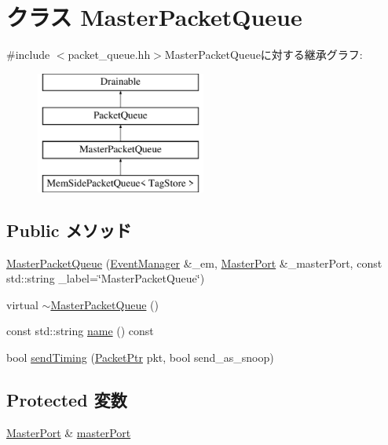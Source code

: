 \hypertarget{classMasterPacketQueue}{
\section{クラス MasterPacketQueue}
\label{classMasterPacketQueue}
}


{\ttfamily \#include $<$packet\_\-queue.hh$>$}MasterPacketQueueに対する継承グラフ:\begin{figure}[H]
\begin{center}
\leavevmode
\includegraphics[height=4cm]{classMasterPacketQueue}
\end{center}
\end{figure}
\subsection*{Public メソッド}
\begin{DoxyCompactItemize}
\item 
\hyperlink{classMasterPacketQueue_a95398bd9589a013635d2d0900aeb04a7}{MasterPacketQueue} (\hyperlink{classEventManager}{EventManager} \&\_\-em, \hyperlink{classMasterPort}{MasterPort} \&\_\-masterPort, const std::string \_\-label=\char`\"{}MasterPacketQueue\char`\"{})
\item 
virtual \hyperlink{classMasterPacketQueue_a24fcd3b9d1504075d27a0cef1ee13ade}{$\sim$MasterPacketQueue} ()
\item 
const std::string \hyperlink{classMasterPacketQueue_a6490f765a824ced1cc94979609fe7e07}{name} () const 
\item 
bool \hyperlink{classMasterPacketQueue_a49e787c20f2f8d3e4fc0b8213bebcfc4}{sendTiming} (\hyperlink{classPacket}{PacketPtr} pkt, bool send\_\-as\_\-snoop)
\end{DoxyCompactItemize}
\subsection*{Protected 変数}
\begin{DoxyCompactItemize}
\item 
\hyperlink{classMasterPort}{MasterPort} \& \hyperlink{classMasterPacketQueue_a43650d24b03c3739d70cd1b9500d1d9b}{masterPort}
\end{DoxyCompactItemize}



